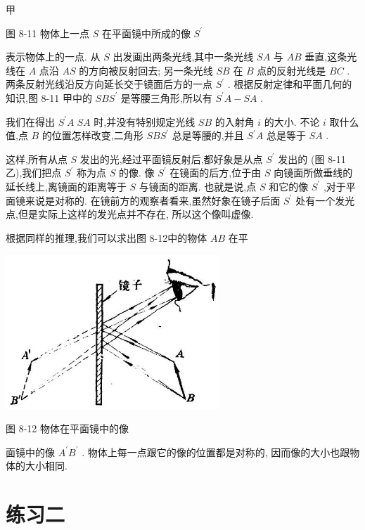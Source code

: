 \documentclass[10pt]{article}
\begin{document}
甲

图 8-11 物体上一点 \(S\) 在平面镜中所成的像 \({S}^{\prime }\)

表示物体上的一点. 从 \(S\) 出发画出两条光线,其中一条光线 \({SA}\) 与 \({AB}\) 垂直,这条光线在 \(A\) 点沿 \({AS}\) 的方向被反射回去; 另一条光线 \({SB}\) 在 \(B\) 点的反射光线是 \({BC}\) . 两条反射光线沿反方向延长交于镜面后方的一点 \({S}^{\prime }\) . 根据反射定律和平面几何的知识,图 8-11 甲中的 \({SB}{S}^{\prime }\) 是等腰三角形,所以有 \({S}^{\prime }A - {SA}\) .

我们在得出 \({S}^{\prime }A\;{SA}\) 时,并没有特别规定光线 \({SB}\) 的入射角 \(i\) 的大小. 不论 \(i\) 取什么值,点 \(B\) 的位置怎样改变,二角形 \({SB}{S}^{\prime }\) 总是等腰的,并且 \({S}^{\prime }A\) 总是等于 \({SA}\) .

这样,所有从点 \(S\) 发出的光,经过平面镜反射后,都好象是从点 \({S}^{\prime }\) 发出的 (图 8-11 乙),我们把点 \({S}^{\prime }\) 称为点 \(S\) 的像. 像 \({S}^{\prime }\) 在镜面的后方,位于由 \(S\) 向镜面所做垂线的延长线上,离镜面的距离等于 \(S\) 与镜面的距离. 也就是说,点 \(S\) 和它的像 \({S}^{\prime }\) ,对于平面镜来说是对称的. 在镜前方的观察者看来,虽然好象在镜子后面 \({S}^{\prime }\) 处有一个发光点,但是实际上这样的发光点并不存在, 所以这个像叫虚像.

根据同样的推理,我们可以求出图 8-12中的物体 \({AB}\) 在平

\begin{center}
\includegraphics[max width=0.6\textwidth]{images/01913056-1f15-74d8-9184-9aab52c9d66b_252_793525.jpg}
\end{center}

图 8-12 物体在平面镜中的像

面镜中的像 \({A}^{\prime }{B}^{\prime }\) . 物体上每一点跟它的像的位置都是对称的, 因而像的大小也跟物体的大小相同.

\section*{练习二}
\end{document}
